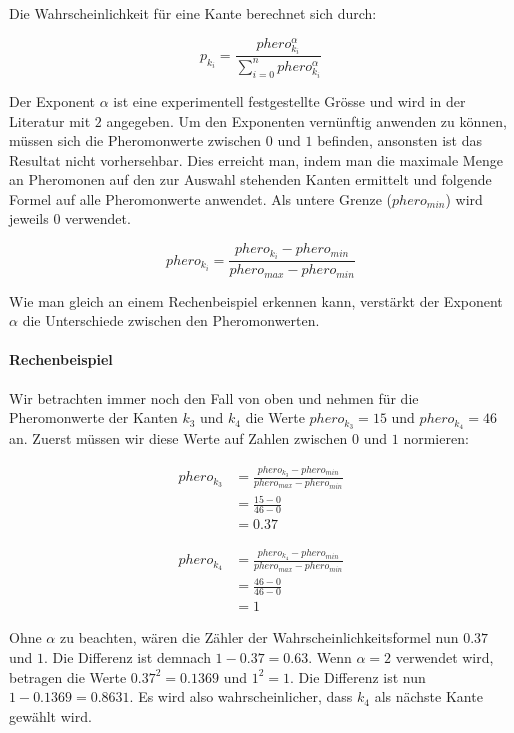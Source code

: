 Die Wahrscheinlichkeit für eine Kante berechnet sich durch:

\[ p_{k_i} = \frac{phero_{k_i}^\alpha}{\sum\nolimits_{i=0}^n phero_{k_i}^\alpha} \]

Der Exponent $\alpha$ ist eine experimentell festgestellte Grösse und wird in der Literatur mit $2$ angegeben. Um den Exponenten vernünftig anwenden zu können, müssen sich die Pheromonwerte zwischen $0$ und $1$ befinden, ansonsten ist das Resultat nicht vorhersehbar. Dies erreicht man, indem man die maximale Menge an Pheromonen auf den zur Auswahl stehenden Kanten ermittelt und folgende Formel auf alle Pheromonwerte anwendet. Als untere Grenze ($phero_{min}$) wird jeweils $0$ verwendet.

\[ phero_{k_i} = \frac{phero_{k_i} - phero_{min}}{phero_{max} - phero_{min}} \] 

Wie man gleich an einem Rechenbeispiel erkennen kann, verstärkt der Exponent $\alpha$ die Unterschiede zwischen den Pheromonwerten. 

\paragraph*{Rechenbeispiel}

Wir betrachten immer noch den Fall von oben und nehmen für die Pheromonwerte der Kanten $k_3$ und $k_4$ die Werte $phero_{k_3} = 15 $ und $phero_{k_4} = 46$ an. Zuerst müssen wir diese Werte auf Zahlen zwischen $0$ und $1$ normieren:

\begin{equation*}
\begin{split}
phero_{k_3} & = \frac{phero_{k_3} - phero_{min}}{phero_{max} - phero_{min}} \\
            & = \frac{15 - 0}{46 - 0} \\
            & = 0.37
\end{split}
\end{equation*}

\begin{equation*}
\begin{split}
phero_{k_4} & = \frac{phero_{k_4} - phero_{min}}{phero_{max} - phero_{min}} \\
            & = \frac{46 - 0}{46 - 0} \\
            & = 1
\end{split}
\end{equation*}

Ohne $\alpha$ zu beachten, wären die Zähler der Wahrscheinlichkeitsformel nun $0.37$ und $1$. Die Differenz ist demnach $1 - 0.37 = 0.63$. Wenn $\alpha = 2$ verwendet wird, betragen die Werte $0.37^2 = 0.1369$ und $1^2 = 1$. Die Differenz ist nun $1 - 0.1369 = 0.8631$. Es wird also wahrscheinlicher, dass $k_4$ als nächste Kante gewählt wird.

